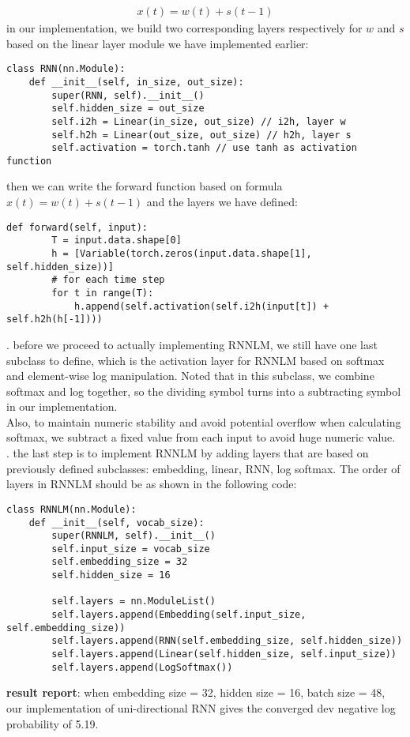 \documentclass[11pt]{article}
\begin{document}
\begin{align*}
x(t) = w(t) + s(t-1)
\end{align*}
\indent in our implementation, we build two corresponding layers respectively for $w$ and $s$ based on the linear layer module we have implemented earlier:
\begin{lstlisting}
class RNN(nn.Module):
    def __init__(self, in_size, out_size):
        super(RNN, self).__init__()
        self.hidden_size = out_size
        self.i2h = Linear(in_size, out_size) // i2h, layer w
        self.h2h = Linear(out_size, out_size) // h2h, layer s
        self.activation = torch.tanh // use tanh as activation function
\end{lstlisting}
\leavevmode
\newline
\indent then we can write the forward function based on formula $x(t) = w(t) + s(t-1)$ and the layers we have defined:
\begin{lstlisting}
def forward(self, input):
        T = input.data.shape[0]
        h = [Variable(torch.zeros(input.data.shape[1], self.hidden_size))]
        # for each time step
        for t in range(T):
            h.append(self.activation(self.i2h(input[t]) + self.h2h(h[-1])))
\end{lstlisting}
\leavevmode
\newline
{}. before we proceed to actually implementing RNNLM, we still have one last subclass to define, which is the activation layer for RNNLM based on softmax and element-wise log manipulation. Noted that in this subclass, we combine softmax and log together, so the dividing symbol turns into a subtracting symbol in our implementation.\\
\indent Also, to maintain numeric stability and avoid potential overflow when calculating softmax, we subtract a fixed value from each input to avoid huge numeric value.\\
. the last step is to implement RNNLM by adding layers that are based on previously defined subclasses: embedding, linear, RNN, log softmax. The order of layers in RNNLM should be as shown in the following code:
\begin{lstlisting}
class RNNLM(nn.Module):
    def __init__(self, vocab_size):
        super(RNNLM, self).__init__()
        self.input_size = vocab_size
        self.embedding_size = 32
        self.hidden_size = 16

        self.layers = nn.ModuleList()
        self.layers.append(Embedding(self.input_size, self.embedding_size))
        self.layers.append(RNN(self.embedding_size, self.hidden_size))
        self.layers.append(Linear(self.hidden_size, self.input_size))
        self.layers.append(LogSoftmax())
\end{lstlisting}
\leavevmode
\indent \textbf{result report}: when embedding size = 32, hidden size = 16, batch size = 48,
our implementation of uni-directional RNN gives the converged dev negative log probability of 5.19.
\end{document}
